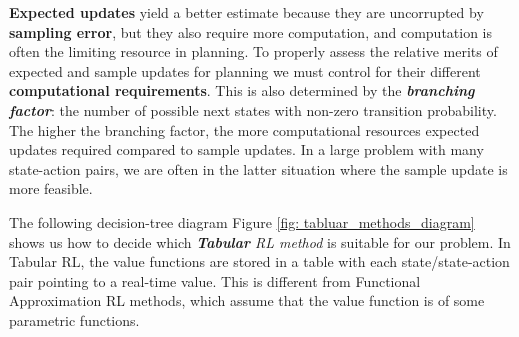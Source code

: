 \documentclass[11pt]{article}
\begin{document}
\textbf{Expected updates} yield a better estimate because they are uncorrupted by \textbf{sampling error}, but they also require more computation, and computation is often the limiting resource in planning. To properly assess the relative merits of expected and sample updates for planning we must control for their different \textbf{computational requirements}. This is also determined by the \emph{\textbf{branching factor}}: the number of possible next states with non-zero transition probability. The higher the branching factor, the more computational resources expected updates required compared to sample updates. In a large problem with many state-action pairs, we are often
in the latter situation where the sample update is more feasible. 


The following decision-tree diagram Figure \ref{fig: tabluar_methods_diagram} shows us how to decide which \emph{\textbf{Tabular} RL method} is suitable for our problem. In Tabular RL, the value functions are stored in a table with each state/state-action pair pointing to a real-time value. This is different from Functional Approximation RL methods, which assume that the value function is of some parametric functions. 
\end{document}
